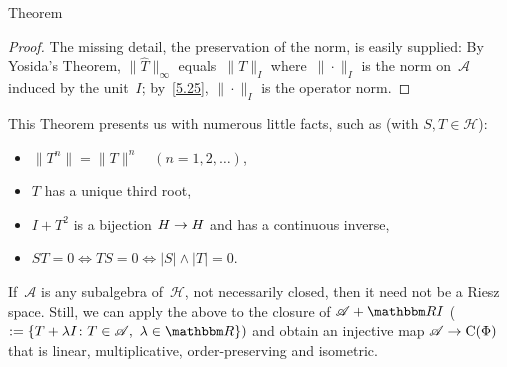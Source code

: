 \documentclass[main.tex]{subfiles}
\begin{document}
\begin{psec}{5.28}{Theorem}\end{psec}
\begin{proof}
The missing detail,
the preservation of the norm,
is easily supplied:
By Yosida's Theorem,
$\|\hat T\|_\infty$
equals~$\|T\|_I$
where~$\|\cdot\|_I$
is the norm on~$\mathscr A$
induced by the unit~$I$;
by~\ref{5.25}, $\|\cdot\|_I$ is the operator norm. \xqed
\end{proof}

\noindent This Theorem presents us with numerous little facts,
such as (with $S,T\in\mathscr H$):
\begin{itemize}
\item $\|T^n\| = \|T\|^n\quad(n=1,2,\dotsc)$,
\item $T$ has a unique third root,
\item $I+T^2$ is a bijection $H\rightarrow H$
and has a continuous inverse,
\item $ST=0\iff TS=0\iff |S|\wedge|T|=0$.
\end{itemize}
If~$\mathscr A$ is any subalgebra of~$\mathscr H$,
not necessarily closed,
then it need not be a Riesz space.
Still, we can apply the above to the closure of
$\mathscr A+\R I$ ($:=\{T+\lambda I\colon T\in\mathscr A,\  \lambda\in\R\})$
and obtain an injective map $\mathscr A\rightarrow\mathrm{C}(\Phi)$
that is linear, multiplicative, order-preserving and isometric.
\end{document}
